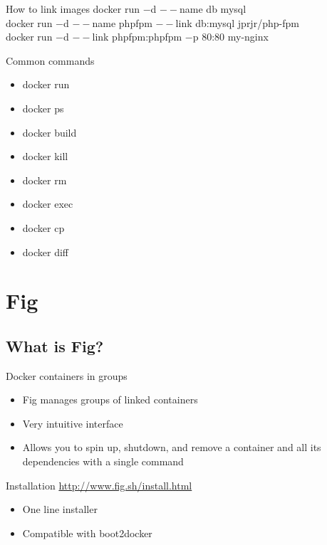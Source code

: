 \documentclass{beamer}
\begin{document}
    \begin{frame}{How to link images}
        docker run $-$d \alert<2>{$--$name db} mysql\\
        docker run $-$d \alert<3>{$--$name phpfpm} $--$link \alert<2>{db}:mysql jprjr/php-fpm\\
        docker run $-$d $--$link \alert<3>{phpfpm}:phpfpm $-$p 80:80 my-nginx\\
    \end{frame}
    \begin{frame}{Common commands}
        \begin{itemize}
            \item docker run
            \item docker ps
            \item docker build
            \item docker kill
            \item docker rm
            \item docker exec
            \item docker cp
            \item docker diff
        \end{itemize}
    \end{frame}
    \section{Fig}
    \subsection{What is Fig?}
    \begin{frame}{Docker containers in groups}
        \begin{itemize}
            \item Fig manages groups of linked containers
            \item Very intuitive interface
            \item Allows you to spin up, shutdown, and remove a container and all its dependencies with a single command
        \end{itemize}
    \end{frame}
    \begin{frame}{Installation}
        \href{http://www.fig.sh/install.html}{http://www.fig.sh/install.html}
        \begin{itemize}
            \item One line installer
            \item Compatible with boot2docker
        \end{itemize}
    \end{frame}
\end{document}
